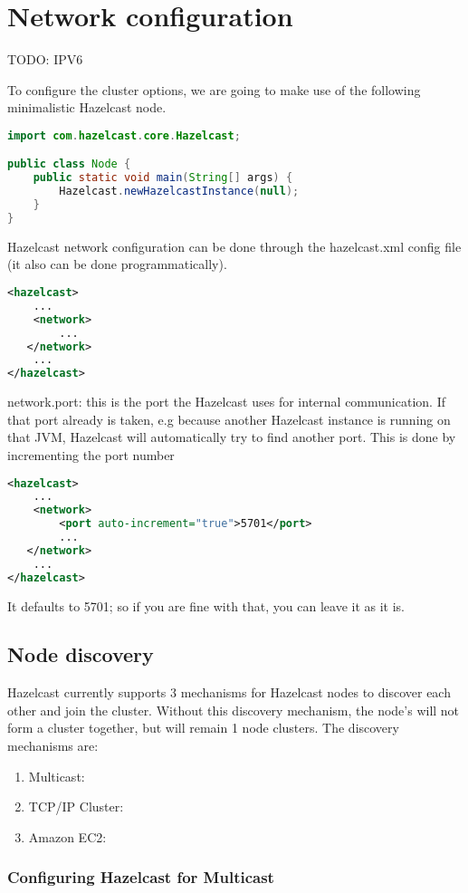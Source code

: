 \chapter{Network configuration}

TODO: IPV6

To configure the cluster options, we are going to make use of the following minimalistic Hazelcast node.
\begin{lstlisting}[language=java]
import com.hazelcast.core.Hazelcast;

public class Node {
    public static void main(String[] args) {
        Hazelcast.newHazelcastInstance(null);
    }
}
\end{lstlisting}

Hazelcast network configuration can be done through the hazelcast.xml config file (it also can be done programmatically).
\begin{lstlisting}[language=xml]
<hazelcast>
    ...
    <network>
        ...  
   </network>
    ...
</hazelcast>
\end{lstlisting}


network.port:
this is the port the Hazelcast uses for internal communication. If that port already is taken, e.g because another Hazelcast instance is running on that JVM, Hazelcast will automatically try to find another port. This is done by incrementing the port number
\begin{lstlisting}[language=xml]
<hazelcast>
    ...
    <network>
        <port auto-increment="true">5701</port>
        ...  
   </network>
    ...
</hazelcast>
\end{lstlisting}
It defaults to 5701; so if you are fine with that, you can leave it as it is.

\section{Node discovery}
Hazelcast currently supports 3 mechanisms for Hazelcast nodes to discover each other and join the cluster. Without this discovery mechanism, the node's will not form a cluster together, but will remain 1 node clusters. The discovery mechanisms are:
\begin{enumerate}
\item Multicast:
\item TCP/IP Cluster:
\item Amazon EC2:
\end{enumerate}

\subsection{Configuring Hazelcast for Multicast}

